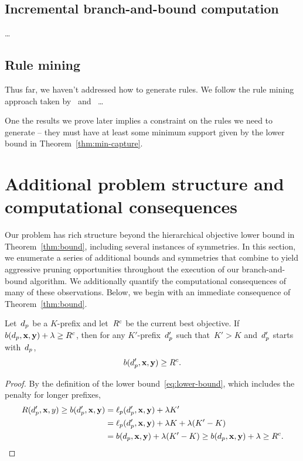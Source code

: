 \subsection{Incremental branch-and-bound computation}

\dots

\subsection{Rule mining}
\label{sec:rule-mining}

Thus far, we haven't addressed how to generate rules.
%
We follow the rule mining approach taken by~\citet{LethamRuMcMa15}
and~\citet{YangRuSe16} \dots

One the results we prove later implies a constraint on the rules
we need to generate -- they must have at least some minimum support
given by the lower bound in Theorem~\ref{thm:min-capture}.

\section{Additional problem structure and computational consequences}

Our problem has rich structure beyond the hierarchical objective lower bound
in Theorem~\ref{thm:bound}, including several instances of symmetries.
%
In this section, we enumerate a series of additional bounds and
symmetries that combine to yield aggressive pruning opportunities
throughout the execution of our branch-and-bound algorithm.
%
We additionally quantify the computational consequences of many
of these observations.
%
Below, we begin with an immediate consequence of Theorem~\ref{thm:bound}.

\begin{lemma}
Let~$d_p$ be a $K$-prefix
and let~${R^c}$ be the current best objective.
%
If ${b(d_p, \mathbf{x}, \mathbf{y}) + {\lambda} \ge {R^c}}$,
then for any $K'$-prefix~$d_p'$ such that~${K' > K}$
and~$d_p'$ starts with~$d_p$,
\begin{align}
 b(\Prefix', \x, \y) \ge \CurrentObj.
\label{eq:lookahead}
\end{align}
\end{lemma}

\begin{proof}
By the definition of the lower bound~\eqref{eq:lower-bound},
which includes the penalty for longer prefixes,
\begin{align}
\Obj(\Prefix', \x, y) \ge b(\Prefix', \x, \y) &= \Loss_p(\Prefix', \x, \y) + \Reg K' \nn \\
&= \Loss_p(\Prefix', \x, \y) + \Reg K + \Reg (K' - K) \nn \\
&= b(\Prefix, \x, \y) + \Reg (K' - K)
\ge b(\Prefix, \x, \y) + \Reg \ge \CurrentObj.
\end{align}
\end{proof}

